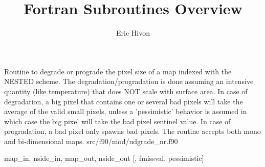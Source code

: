 
\sloppy


\title{\healpix Fortran Subroutines Overview}
 \section[udgrade\_nest*]{ }
\label{sub:udgrade_nest}
\author{Eric Hivon}


\begin{facility}
{Routine to degrade or prograde the pixel size of a \healpix map indexed with
  the NESTED scheme. The degradation/progradation is done assuming an
intensive quantity (like temperature) that does NOT scale with surface area. \newline
In case of degradation, a big pixel that contains one or several bad pixels will
take the average of the valid small pixels, unless a 'pessimistic' behavior
is assumed in which case the big pixel will take the bad pixel sentinel value.
In case of progradation, a bad pixel only spawns bad pixels. \newline
The routine accepts both mono and bi-dimensional maps.
}
{src/f90/mod/udgrade\_nr.f90}
\end{facility}

\begin{f90format}
{map\_in, nside\_in, map\_out, nside\_out [, fmissval, pessimistic]}
\end{f90format}

